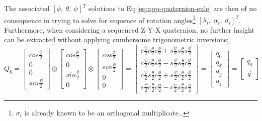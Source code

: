 \par
The associated $[\phi,~\theta,~\psi]^T$ solutions to Eq:\ref{eq:app-quaternion-eule} are then of no consequence in trying to solve for sequence of rotation angles\footnote{$\sigma_i$ is already known to be an orthogonal multiplicate\ldots} $[\lambda_i,~\alpha_i,~\sigma_i]^T$. Furthermore, when considering a sequenced Z-Y-X quaternion, no further insight can be extracted without applying cumbersome trigonometric inversions;
\begin{subequations}
\begin{equation}
Q_b=\begin{bmatrix}
cos\frac{\psi}{2}\\
0\\
0\\
sin\frac{\psi}{2}
\end{bmatrix}
\otimes
\begin{bmatrix}
cos\frac{\theta}{2}\\
0\\
sin\frac{\theta}{2}\\
0
\end{bmatrix}
\otimes
\begin{bmatrix}
cos\frac{\phi}{2}\\
sin\frac{\phi}{2}\\
0\\
0
\end{bmatrix}
\end{equation}
\begin{equation}
=
\begin{bmatrix}
c\frac{\psi}{2}c\frac{\theta}{2}c\frac{\phi}{2}+s\frac{\psi}{2}s\frac{\theta}{2}s\frac{\phi}{2}\\
c\frac{\psi}{2}c\frac{\theta}{2}s\frac{\phi}{2}-s\frac{\psi}{2}s\frac{\theta}{2}c\frac{\phi}{2}\\
c\frac{\psi}{2}s\frac{\theta}{2}c\frac{\phi}{2}+s\frac{\psi}{2}c\frac{\theta}{2}s\frac{\phi}{2}\\
s\frac{\psi}{2}c\frac{\theta}{2}c\frac{\phi}{2}-c\frac{\psi}{2}s\frac{\theta}{2}s\frac{\phi}{2}
\end{bmatrix}
=
\begin{bmatrix}
q_0\\
q_x\\
q_y\\
q_z
\end{bmatrix}
=
\begin{bmatrix}
q_0\\
\vec{q}
\end{bmatrix}
\end{equation}

\end{subequations}
